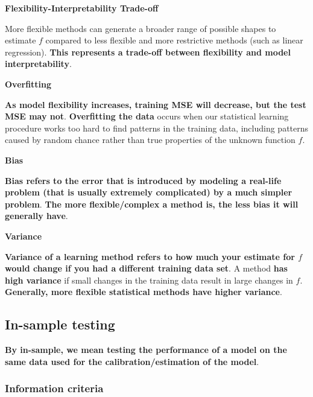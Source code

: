\documentclass[12pt,a4paper]{article}
\begin{document}
\vspace{0.5em}

\textbf{Flexibility-Interpretability Trade-off}

More flexible methods can generate a broader range of possible shapes to estimate $f$ compared to less flexible and more restrictive methods (such as linear regression). \textbf{This represents a trade-off between flexibility and model interpretability}.

\vspace{0.5em}

\textbf{Overfitting}

\textbf{As model flexibility increases, training MSE will decrease, but the test MSE may not}. \textbf{Overfitting the data} occurs when our statistical learning procedure works too hard to find patterns in the training data, including patterns caused by random chance rather than true properties of the unknown function $f$.

\vspace{0.5em}

\textbf{Bias}

\textbf{Bias refers to the error that is introduced by modeling a real-life problem (that is usually extremely complicated) by a much simpler problem}. \textbf{The more flexible/complex a method is, the less bias it will generally have}.

\vspace{0.5em}

\textbf{Variance}

\textbf{Variance of a learning method refers to how much your estimate for $f$ would change if you had a different training data set}. A method \textbf{has high variance} if small changes in the training data result in large changes in $f$. \textbf{Generally, more flexible statistical methods have higher variance}.

\subsection{In-sample testing}

\textbf{By in-sample, we mean testing the performance of a model on the same data used for the calibration/estimation of the model}.

\vspace{0.5em}

\subsubsection{Information criteria}
\end{document}
